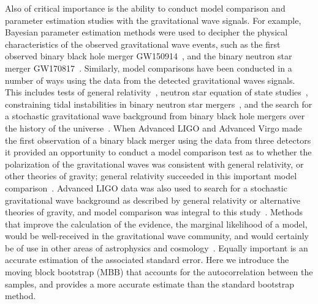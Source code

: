\documentclass[aps,reprint,amsmath,amssymb,showpacs,showkeys]{revtex4-1}%
\newcommand{\jv}[1]{\textcolor{cyan}{JV: #1}}
\begin{document}
Also of critical importance is the ability to conduct model comparison and parameter estimation studies with the gravitational wave signals. For example, Bayesian parameter estimation methods were used to decipher the physical characteristics of the observed gravitational wave events, such as the first observed binary black hole merger GW150914~\cite{PhysRevLett.116.061102,PhysRevLett.116.241102,PhysRevX.6.041014,O1BBH}, and the binary neutron star merger GW170817~\cite{PhysRevLett.119.161101,Abbott:2018wiz}. Similarly, model comparisons have been conducted in a number of ways using the data from the detected gravitational waves signals. This includes tests of general relativity~\cite{PhysRevLett.116.221101}, neutron star equation of state studies~\cite{PhysRevLett.119.161101,Abbott:2018exr}, constraining tidal instabilities in binary neutron star mergers~\cite{Weinberg:2018icl}, and the search for a stochastic gravitational wave background from binary black hole mergers over the history of the universe~\cite{PhysRevX.8.021019}. When Advanced LIGO and Advanced Virgo made the first observation of a binary black merger using the data from three detectors it provided an opportunity to conduct a model comparison test as to whether the polarization of the gravitational waves was consistent with general relativity, or other theories of gravity; general relativity succeeded in this important model comparison~\cite{PhysRevLett.119.141101}. Advanced LIGO data was also used to search for a stochastic gravitational wave background as described by general relativity or alternative theories of gravity, and model comparison was integral to this study~\cite{PhysRevX.7.041058,PhysRevLett.120.201102}. Methods that  improve the calculation of the evidence, the marginal likelihood of a model, would be well-received in the gravitational wave community, and would certainly be of use in other areas of astrophysics and cosmology~\cite{doi:10.1146/annurev-astro-082214-122339}. Equally important is an accurate estimation of the associated standard error. Here we introduce the moving block bootstrap (MBB) \citep{Kunsch:1989} that accounts for the autocorrelation between the samples, and provides a more accurate estimate than the standard bootstrap method.

\end{document}
